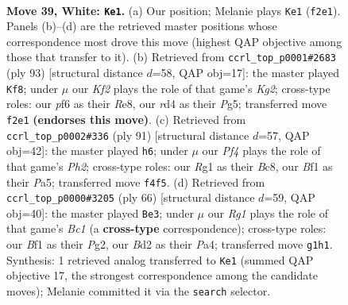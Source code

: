 \documentclass[11pt]{article}
\begin{document}
\clearpage

\begin{figure}[p]\centering
\begin{subfigure}{0.46\textwidth}\centering
\resizebox{\linewidth}{!}{%
\newchessgame
\chessboard[
  setfen={1r2n1R1/p1p1k3/2P2p2/8/3r1P1p/1P6/3B1K1P/5BR1 w - - 2 39},
  showmover=false,
  pgfstyle=straightmove, color=movearrow, markmove={f2-e1}
]}
\caption{}
\end{subfigure}\hfill
\begin{subfigure}{0.46\textwidth}\centering
\resizebox{\linewidth}{!}{%
\newchessgame
\chessboard[
  setfen={4r3/6k1/4r3/3p2p1/3P2Pp/R3pP1P/2b5/4RKN1 b - - 7 47},
  showmover=false,
  pgfstyle=straightmove, color=movearrow, markmove={g7-f8}
]}
\caption{}
\end{subfigure}
\\[4pt]
\begin{subfigure}{0.46\textwidth}\centering
\resizebox{\linewidth}{!}{%
\newchessgame
\chessboard[
  setfen={2b2r2/7p/3k2P1/p1p4P/3rpN1K/1P2R3/P7/5R2 b - - 0 46},
  showmover=false,
  pgfstyle=straightmove, color=movearrow, markmove={h7-h6}
]}
\caption{}
\end{subfigure}\hfill
\begin{subfigure}{0.46\textwidth}\centering
\resizebox{\linewidth}{!}{%
\newchessgame
\chessboard[
  setfen={3r4/6p1/4k2p/R2np3/P3p2P/8/r4PP1/2BR2K1 w - - 0 34},
  showmover=false,
  pgfstyle=straightmove, color=movearrow, markmove={c1-e3}
]}
\caption{}
\end{subfigure}
\caption{\textbf{Move 39, White: \texttt{Ke1}.} (a) Our position; Melanie plays \texttt{Ke1} (\texttt{f2e1}). Panels (b)--(d) are the retrieved master positions whose correspondence most drove this move (highest QAP objective among those that transfer to it). (b) Retrieved from \texttt{ccrl\_top\_p0001\#2683} (ply 93) [structural distance $d$=58, QAP obj=17]: the master played \texttt{Kf8}; under $\mu$ our \emph{Kf2} plays the role of that game's \emph{Kg2}; cross-type roles: our \emph{p}f6 as their \emph{R}e8, our \emph{r}d4 as their \emph{P}g5; transferred move \texttt{f2e1} \textbf{(endorses this move)}. (c) Retrieved from \texttt{ccrl\_top\_p0002\#336} (ply 91) [structural distance $d$=57, QAP obj=42]: the master played \texttt{h6}; under $\mu$ our \emph{Pf4} plays the role of that game's \emph{Ph2}; cross-type roles: our \emph{R}g1 as their \emph{B}c8, our \emph{B}f1 as their \emph{P}a5; transferred move \texttt{f4f5}. (d) Retrieved from \texttt{ccrl\_top\_p0000\#3205} (ply 66) [structural distance $d$=59, QAP obj=40]: the master played \texttt{Be3}; under $\mu$ our \emph{Rg1} plays the role of that game's \emph{Bc1} (a \textbf{cross-type} correspondence); cross-type roles: our \emph{B}f1 as their \emph{P}g2, our \emph{B}d2 as their \emph{P}a4; transferred move \texttt{g1h1}. Synthesis: 1 retrieved analog transferred to \texttt{Ke1} (summed QAP objective 17, the strongest correspondence among the candidate moves); Melanie committed it via the \texttt{search} selector.}
\label{fig:thought-m76}
\end{figure}
\end{document}
